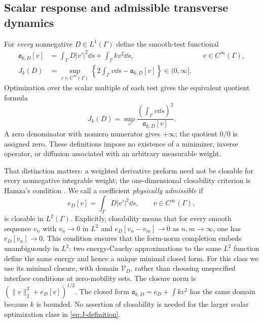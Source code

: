 \subsection{Scalar response and admissible transverse dynamics}
\label{sec:forms}
For \emph{every} nonnegative $D\in L^1(\Gamma)$ define the smooth-test
functional
\begin{align}
 \mathfrak a_{k,D}[v]
   &=\int_\Gamma D|v'|^2\dd s+\int_\Gamma kv^2\dd s,
       &&v\in C^\infty(\Gamma),\label{eq:scalar-form}\\
 J_k(D)&=\sup_{v\in C^\infty(\Gamma)}
       \left\{2\int_\Gamma v\dd s-\mathfrak a_{k,D}[v]\right\}
       \in(0,\infty].\label{eq:J-definition}
\end{align}
Optimization over the scalar multiple of each test gives the equivalent
quotient formula
\begin{equation}\label{eq:J-quotient}
 J_k(D)=\sup_v\frac{(\int_\Gamma v\dd s)^2}{\mathfrak a_{k,D}[v]}.
\end{equation}
A zero denominator with nonzero numerator gives $+\infty$; the quotient
$0/0$ is assigned zero. These definitions impose no existence of a
minimizer, inverse operator, or diffusion associated with an arbitrary
measurable weight.

That distinction matters: a weighted derivative preform need not be
closable for every nonnegative integrable weight; the one-dimensional
closability criterion is Hamza's condition
\citep[Theorem~3.1.6]{FukushimaOshimaTakeda2011}. We call a coefficient
\emph{physically admissible} if
\begin{equation}\label{eq:surface-preform}
 e_D[v]=\int_\Gamma D|v'|^2\dd s,\qquad v\in C^\infty(\Gamma),
\end{equation}
is closable in $L^2(\Gamma)$. Explicitly, closability means that for
every smooth sequence $v_n$ with $v_n\to0$ in $L^2$ and
$e_D[v_n-v_m]\to0$ as $n,m\to\infty$, one has $e_D[v_n]\to0$.
This condition ensures that the form-norm completion embeds
unambiguously in $L^2$: two energy-Cauchy approximations to the same
$L^2$ function define the same energy and hence a unique minimal closed
form. For this class we use its minimal closure,
with domain $\mathcal V_D$, rather than choosing unspecified interface
conditions at zero-mobility sets. The closure norm is
$(\|v\|_2^2+e_D[v])^{1/2}$. The closed form
$\mathfrak a_{k,D}=e_D+\int kv^2$ has the same domain because $k$ is
bounded. No assertion of closability is needed for the larger scalar
optimization class in \eqref{eq:J-definition}.

